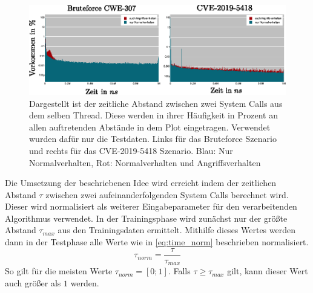                     \begin{figure}
                        \centering
                        \includegraphics[width=\textwidth]{images/CVE-2012--Test-data-time_delta.eps}
                        \caption[Zeitliche Abstände zwischen System Calls]{Dargestellt ist der zeitliche Abstand zwischen zwei System Calls aus dem selben Thread.
                                 Diese werden in ihrer Häufigkeit in Prozent an allen auftretenden Abstände in dem Plot eingetragen.
                                 Verwendet wurden dafür nur die Testdaten. Links für das Bruteforce Szenario und rechts für das CVE-2019-5418 Szenario.
                                 Blau: Nur Normalverhalten, Rot: Normalverhalten und Angriffsverhalten}
                        \label{fig:time_delta}
                    \end{figure}

                    Die Umsetzung der beschriebenen Idee wird erreicht indem der zeitlichen Abstand $\tau$ zwischen zwei aufeinanderfolgenden System Calls berechnet wird.
                    Dieser wird normalisiert als weiterer Eingabeparameter für den verarbeitenden Algorithmus verwendet.
                    In der Trainingsphase wird zunächst nur der größte Abstand $\tau_{max}$ aus den Trainingsdaten ermittelt.
                    Mithilfe dieses Wertes werden dann in der Testphase alle Werte wie in \autoref{eq:time_norm} beschrieben normalisiert.
                    \begin{equation}\label{eq:time_norm}
                        \tau_{norm} = \frac{\tau}{\tau_{max}}
                    \end{equation}
                    So gilt für die meisten Werte $\tau_{norm}=[0;1]$.
                    Falls $\tau\geq\tau_{max}$ gilt, kann dieser Wert auch größer als $1$ werden.

